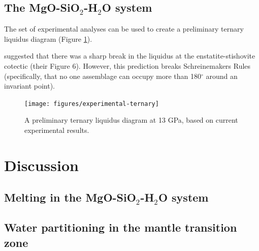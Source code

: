 \documentclass[review]{elsarticle}
\begin{document}

\clearpage
\subsection{The MgO-SiO$_2$-H$_2$O system}
The set of experimental analyses can be used to create a preliminary ternary liquidus diagram (Figure \ref{fig:ternary}). 

\cite{YII2004} suggested that there was a sharp break in the liquidus at the enstatite-stishovite cotectic (their Figure 6). However, this prediction breaks Schreinemakers Rules (specifically, that no one assemblage can occupy more than 180$^{\circ}$ around an invariant point).

\citep{MSUP2007}

\begin{figure}[ht!]
  \centering
      \texttt{[image: figures/experimental-ternary]}
  \caption{A preliminary ternary liquidus diagram at 13 GPa, based on current experimental results.}
  \label{fig:ternary}
\end{figure}


\section{Discussion}
\subsection{Melting in the MgO-SiO$_2$-H$_2$O system}
\subsection{Water partitioning in the mantle transition zone}
\end{document}
